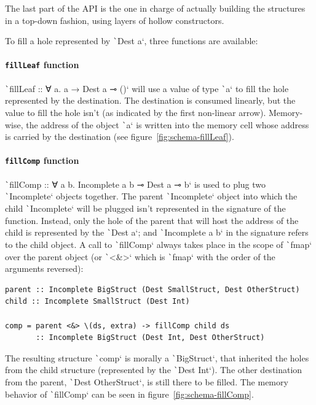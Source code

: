 \documentclass[english]{jflart}
\begin{document}
The last part of the API is the one in charge of actually building the structures in a top-down fashion, using layers of hollow constructors. 

To fill a hole represented by \texttt`Dest a`, three functions are available:

\paragraph{\texttt{fillLeaf} function}

\texttt`fillLeaf :: ∀ a. a → Dest a ⊸ ()` will use a value of type \texttt`a` to fill the hole represented by the destination. The destination is consumed linearly, but the value to fill the hole isn't (as indicated by the first non-linear arrow). Memory-wise, the address of the object \texttt`a` is written into the memory cell whose address is carried by the destination (see figure~\ref{fig:schema-fillLeaf}).

\paragraph{\texttt{fillComp} function}

\texttt`fillComp :: ∀ a b. Incomplete a b ⊸ Dest a ⊸ b` is used to plug two \texttt`Incomplete` objects together. The parent \texttt`Incomplete` object into which the child \texttt`Incomplete` will be plugged isn't represented in the signature of the function. Instead, only the hole of the parent that will host the address of the child is represented by the \texttt`Dest a`; and \texttt`Incomplete a b` in the signature refers to the child object. A call to \texttt`fillComp` always takes place in the scope of \texttt`fmap` over the parent object (or \texttt`<&>` which is \texttt`fmap` with the order of the arguments reversed):
{\small
\begin{verbatim}
parent :: Incomplete BigStruct (Dest SmallStruct, Dest OtherStruct)
child :: Incomplete SmallStruct (Dest Int)

comp = parent <&> \(ds, extra) -> fillComp child ds
       :: Incomplete BigStruct (Dest Int, Dest OtherStruct)
\end{verbatim}
}
The resulting structure \texttt`comp` is morally a \texttt`BigStruct`, that inherited the holes from the child structure (represented by the \texttt`Dest Int`). The other destination from the parent, \texttt`Dest OtherStruct`, is still there to be filled. The memory behavior of \texttt`fillComp` can be seen in figure~\ref{fig:schema-fillComp}.
\end{document}
